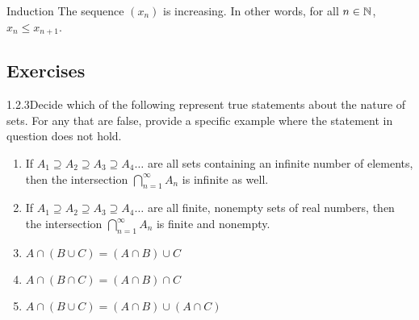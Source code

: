 \begin{example}
    {Induction} The sequence \((x_n)\) is increasing. In other words, for all \(n\in \mathbb{N}\), \(x_n \leq x_{n+1}\). 
\end{example}


\subsection*{Exercises}

\begin{exercise}
    {1.2.3}Decide which of the following represent true statements about
the nature of sets. For any that are false, provide a specific example where the
statement in question does not hold.
\begin{enumerate}
    \item If \(A_1 \supseteq A_2 \supseteq A_3 \supseteq A_4\dots\) are all sets containing an infinite number of
elements, then the intersection \(\bigcap^\infty_{n=1} A_n\) is infinite as well.
    \item If \(A_1 \supseteq A_2 \supseteq A_3 \supseteq A_4\dots\) are all finite, nonempty sets of real numbers,
then the intersection \(\bigcap^\infty_{n=1} A_n\) is finite and nonempty.
    \item \(A \cap (B \cup C) = (A \cap B) \cup C\)
    \item \(A \cap (B \cap C) = (A \cap B) \cap C\)
    \item \(A \cap (B \cup C) = (A \cap B) \cup (A \cap C)\)
\end{enumerate}
\end{exercise}

